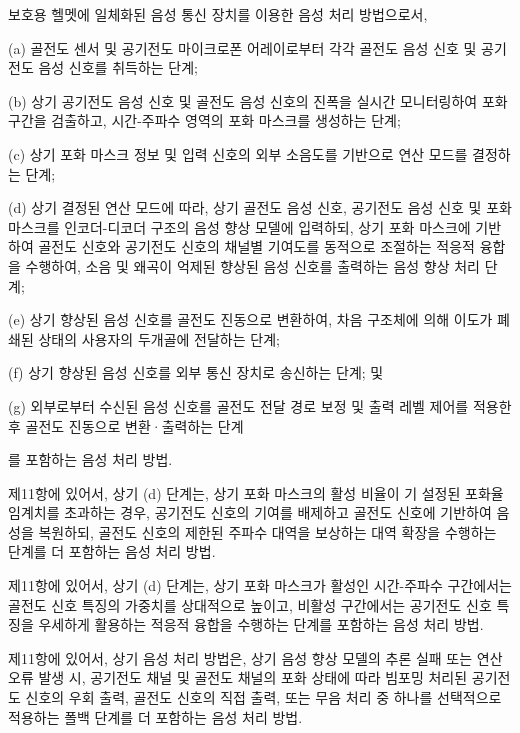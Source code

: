 \documentclass{article}
\begin{document}
\begin{enumerate}[label=\textbf{[\arabic*]}]

    \item 보호용 헬멧에 일체화된 음성 통신 장치를 이용한 음성 처리 방법으로서,

    (a) 골전도 센서 및 공기전도 마이크로폰 어레이로부터 각각 골전도 음성 신호 및 공기전도 음성 신호를 취득하는 단계;

    (b) 상기 공기전도 음성 신호 및 골전도 음성 신호의 진폭을 실시간 모니터링하여 포화 구간을 검출하고, 시간-주파수 영역의 포화 마스크를 생성하는 단계;

    (c) 상기 포화 마스크 정보 및 입력 신호의 외부 소음도를 기반으로 연산 모드를 결정하는 단계;

    (d) 상기 결정된 연산 모드에 따라, 상기 골전도 음성 신호, 공기전도 음성 신호 및 포화 마스크를 인코더-디코더 구조의 음성 향상 모델에 입력하되, 상기 포화 마스크에 기반하여 골전도 신호와 공기전도 신호의 채널별 기여도를 동적으로 조절하는 적응적 융합을 수행하여, 소음 및 왜곡이 억제된 향상된 음성 신호를 출력하는 음성 향상 처리 단계;

    (e) 상기 향상된 음성 신호를 골전도 진동으로 변환하여, 차음 구조체에 의해 이도가 폐쇄된 상태의 사용자의 두개골에 전달하는 단계;

    (f) 상기 향상된 음성 신호를 외부 통신 장치로 송신하는 단계; 및

    (g) 외부로부터 수신된 음성 신호를 골전도 전달 경로 보정 및 출력 레벨 제어를 적용한 후 골전도 진동으로 변환·출력하는 단계

    를 포함하는 음성 처리 방법.


    \item 제11항에 있어서,
    상기 (d) 단계는, 상기 포화 마스크의 활성 비율이 기 설정된 포화율 임계치를 초과하는 경우, 공기전도 신호의 기여를 배제하고 골전도 신호에 기반하여 음성을 복원하되, 골전도 신호의 제한된 주파수 대역을 보상하는 대역 확장을 수행하는 단계를 더 포함하는 음성 처리 방법.

    \item 제11항에 있어서,
    상기 (d) 단계는, 상기 포화 마스크가 활성인 시간-주파수 구간에서는 골전도 신호 특징의 가중치를 상대적으로 높이고, 비활성 구간에서는 공기전도 신호 특징을 우세하게 활용하는 적응적 융합을 수행하는 단계를 포함하는 음성 처리 방법.

    \item 제11항에 있어서,
    상기 음성 처리 방법은, 상기 음성 향상 모델의 추론 실패 또는 연산 오류 발생 시, 공기전도 채널 및 골전도 채널의 포화 상태에 따라 빔포밍 처리된 공기전도 신호의 우회 출력, 골전도 신호의 직접 출력, 또는 무음 처리 중 하나를 선택적으로 적용하는 폴백 단계를 더 포함하는 음성 처리 방법.


\end{enumerate}
\end{document}
